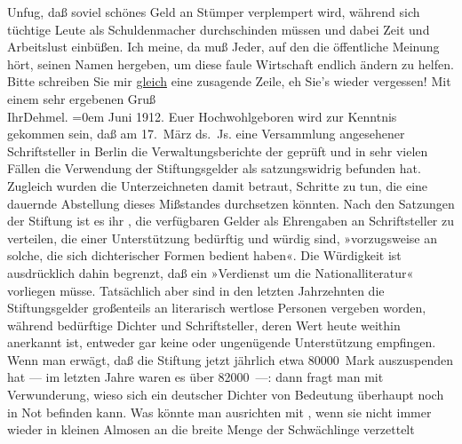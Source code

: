 \begin{ledgroupsized}[t]{13cm}
               Unfug, daß soviel schönes Geld an Stümper verplempert wird, während sich tüchtige
               Leute als Schuldenmacher durchschinden müssen und dabei Zeit und Arbeitslust
               einbüßen. Ich meine, da muß Jeder, auf den die öffentliche Meinung hört, seinen Namen
               hergeben, um diese faule Wirtschaft endlich ändern zu helfen. Bitte schreiben Sie mir
                  \uline{gleich} eine zusagende Zeile, eh Sie’s wieder
               vergessen! \pend
           \pstart
           Mit einem sehr ergebenen Gruß{\\[\baselineskip]}Ihr\spacefill\mbox{Dehmel.}\pend
           \leftskip=0em{}{\bigskip}\pstart
           \raggedleft{}{\pb}Juni 1912.\pend
           \pstart{}Euer Hochwohlgeboren\pend\pstart
           wird zur Kenntnis gekommen sein, daß am 17. März ds. Js. eine
               Versammlung angesehener Schriftsteller in Berlin
               die Verwaltungsberichte der  geprüft und in sehr vielen Fällen die Verwendung der Stiftungsgelder als
               satzungswidrig befunden hat. Zugleich wurden die Unterzeichneten damit betraut,
               Schritte zu tun, die eine dauernde Abstellung dieses Mißstandes durchsetzen
               könnten.\pend
           \pstart
           Nach den Satzungen der Stiftung ist es ihr , die
               verfügbaren Gelder als Ehrengaben an Schriftsteller zu verteilen, die einer
               Unterstützung bedürftig und würdig sind, »vorzugsweise an solche, die sich
               dichterischer Formen bedient haben«. Die Würdigkeit ist ausdrücklich dahin begrenzt,
               daß ein »Verdienst um die Nationalliteratur« vorliegen müsse. Tatsächlich aber sind
               in den letzten Jahrzehnten die Stiftungsgelder großenteils an literarisch wertlose
               Personen vergeben worden, während bedürftige Dichter und Schriftsteller, deren Wert
               heute weithin anerkannt ist, entweder gar keine oder ungenügende Unterstützung
               empfingen.\pend
           \pstart
           Wenn man erwägt, daß die Stiftung jetzt jährlich etwa 80000 Mark auszuspenden hat —
               im letzten Jahre waren es über 82000 —: dann fragt man mit Verwunderung, wieso sich
               ein deutscher Dichter von Bedeutung überhaupt noch in Not befinden kann. Was könnte
               man ausrichten mit , wenn sie nicht
               immer wieder in kleinen Almosen an die breite Menge der Schwächlinge verzettelt

\end{ledgroupsized}
